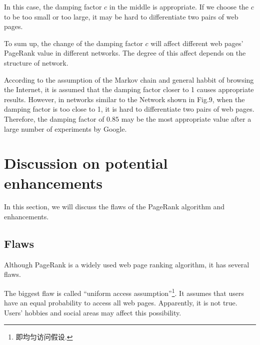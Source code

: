 \documentclass[lettersize,journal,12pt,conference]{IEEEtran}
\begin{document}
In this case, the damping factor $c$ in the middle is appropriate. If we choose the $c$ to be too small or too large, it may be hard to differentiate two pairs of web pages.

To sum up, the change of the damping factor $c$ will affect different web pages' PageRank value in different networks. The degree of this affect depends on the structure of network. 

According to the assumption of the Markov chain and general habbit of browsing the Internet, it is assumed that the damping factor closer to 1 causes appropriate results. However, in networks similar to the Network shown in Fig.9, when the damping factor is too close to 1, it is hard to differentiate two pairs of web pages. Therefore, the damping factor of $0.85$ may be the most appropriate value after a large number of experiments by Google.

\section{Discussion on potential enhancements}

In this section, we will discuss the flaws of the PageRank algorithm and enhancements.

\subsection{Flaws}

Although PageRank is a widely used web page ranking algorithm, it has several flaws.

The biggest flaw is called ``uniform access assumption''\footnote[1]{即均匀访问假设.}. It assumes that users have an equal probability to access all web pages. Apparently, it is not true. Users' hobbies and social areas may affect this possibility.
\end{document}
